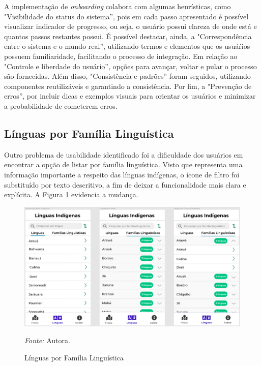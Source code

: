 A implementação de \textit{onboarding} colabora com algumas heurísticas, como "Visibilidade do status do sistema'', pois em cada passo apresentado é possível visualizar indicador de progresso, ou seja, 
o usuário possui clareza de onde está e quantos passos restantes possui. É possível destacar, ainda, a "Correspondência entre o sistema e o mundo real'', utilizando termos e elementos que os usuáŕios 
possuem familiaridade, facilitando o processo de integração. Em relação ao "Controle e liberdade do usuário'', opções para avançar, voltar e pular o processo são fornecidas. Além disso, "Consistência e 
padrões'' foram seguidos, utilizando componentes reutilizáveis e garantindo a consistência. Por fim, a "Prevenção de erros'', por incluir dicas e exemplos visuais para orientar os usuários e  minimizar 
a probabilidade de cometerem erros.

\subsection{Línguas por Família Linguística}
\label{sec:Familia Linguistica}
Outro problema de usabilidade identificado foi a dificuldade dos usuários em encontrar a opção de listar por família linguística. Visto que representa uma informação importante a respeito das línguas indígenas, 
o ícone de filtro foi substituído por texto descritivo, a fim de deixar a funcionalidade mais clara e  explícita. A Figura \ref{fig24} evidencia a mudança.

\begin{figure}[h!]
	\centering
	\caption{Línguas por Família Linguística}
	\begin{adjustbox}{center}
		\includegraphics[width=1\textwidth]{figuras/linguas.eps}
	\end{adjustbox}
		\begin{tablenotes}[flushleft]
		\centering
		\item \textit{Fonte:} Autora.
	\end{tablenotes}
	\label{fig24}
\end{figure}

